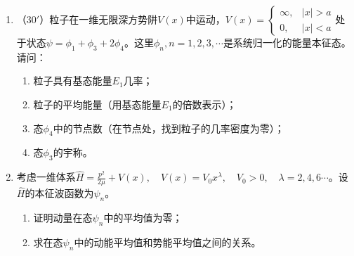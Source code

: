 


\begin{enumerate}
	\item
（$30'$）粒子在一维无限深方势阱$V(x)$中运动，$V(x)=\begin{cases}\infty,&|x|>a\\0,&|x|<a\end{cases}$处于状态$\psi=\phi_1+\phi_3+2\phi_4$。这里$\phi_n,n=1,2,3,\cdots$是系统归一化的能量本征态。请问：
\begin{enumerate}
	\item
粒子具有基态能量$E_1$几率；
\item 
粒子的平均能量（用基态能量$E_1$的倍数表示）；
\item 
态$\phi_4$中的节点数（在节点处，找到粒子的几率密度为零）；
\item 
态$\phi_3$的宇称。

\end{enumerate}

\banswer{
	
}


\item 
考虑一维体系$\hat{H}=\frac{p^2}{2\mu}+V(x),\quad V(x)=V_0x^\lambda,\quad V_0>0,\quad \lambda=2,4,6\cdots$。设$\hat{H}$的本征波函数为$\psi_n$。
\begin{enumerate}
	\item
证明动量在态$\psi_n$中的平均值为零；

\item 
求在态$\psi_n$中的动能平均值和势能平均值之间的关系。

	
\end{enumerate}


\end{enumerate}
